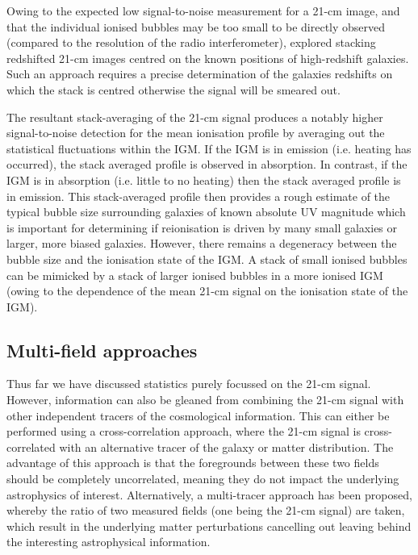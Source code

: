Owing to the expected low signal-to-noise measurement for a 21-cm image, and that the individual ionised bubbles may be too small to be directly observed (compared to the resolution of the radio interferometer), \cite{Geil:2017} explored stacking redshifted 21-cm images centred on the known positions of high-redshift galaxies. Such an approach requires a precise determination of the galaxies redshifts on which the stack is centred otherwise the signal will be smeared out.

The resultant stack-averaging of the 21-cm signal produces a notably higher signal-to-noise detection for the mean ionisation profile by averaging out the statistical fluctuations within the IGM. If the IGM is in emission (i.e. heating has occurred), the stack averaged profile is observed in absorption. In contrast, if the IGM is in absorption (i.e. little to no heating) then the stack averaged profile is in emission. This stack-averaged profile then provides a rough estimate of the typical bubble size surrounding galaxies of known absolute UV magnitude which is important for determining if reionisation is driven by many small galaxies or larger, more biased galaxies. However, there remains a degeneracy between the bubble size and the ionisation state of the IGM. A stack of small ionised bubbles can be mimicked by a stack of larger ionised bubbles in a more ionised IGM (owing to the dependence of the mean 21-cm signal on the ionisation state of the IGM).

\subsection{Multi-field approaches}

Thus far we have discussed statistics purely focussed on the 21-cm signal. However, information can also be gleaned from combining the 21-cm signal with other independent tracers of the cosmological information. This can either be performed using a cross-correlation approach, where the 21-cm signal is cross-correlated with an alternative tracer of the galaxy or matter distribution. The advantage of this approach is that the foregrounds between these two fields should be completely uncorrelated, meaning they do not impact the underlying astrophysics of interest. Alternatively, a multi-tracer approach has been proposed, whereby the ratio of two measured fields (one being the 21-cm signal) are taken, which result in the underlying matter perturbations cancelling out leaving behind the interesting astrophysical information.

